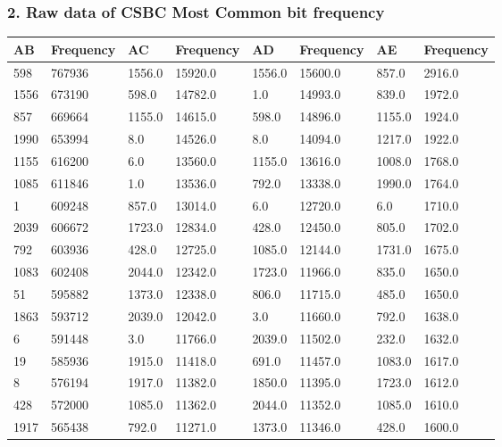 \subsubsection{2. Raw data of CSBC Most Common bit frequency}
\FloatBarrier
\begin{table}[H]
	\centering
	\small
	\renewcommand{\arraystretch}{0.7} %
	\begin{threeparttable}
		\begin{tabular}{p{1cm} p{2cm} p{1cm} p{2cm} p{1cm} p{2cm} p{1cm} p{2cm}}
			\hline
			AB \tnote{c} & Frequency & AC & Frequency & AD & Frequency & AE & Frequency \\ 
			\hline
			598  & 767936 & 1556.0 & 15920.0 & 1556.0 & 15600.0 & 857.0  & 2916.0  \\  
			1556 & 673190 & 598.0  & 14782.0 & 1.0    & 14993.0 & 839.0  & 1972.0  \\  
			857  & 669664 & 1155.0 & 14615.0 & 598.0  & 14896.0 & 1155.0 & 1924.0  \\  
			1990 & 653994 & 8.0    & 14526.0 & 8.0    & 14094.0 & 1217.0 & 1922.0  \\  
			1155 & 616200 & 6.0    & 13560.0 & 1155.0 & 13616.0 & 1008.0 & 1768.0  \\  
			1085 & 611846 & 1.0    & 13536.0 & 792.0  & 13338.0 & 1990.0 & 1764.0  \\  
			1    & 609248 & 857.0  & 13014.0 & 6.0    & 12720.0 & 6.0    & 1710.0  \\  
			2039 & 606672 & 1723.0 & 12834.0 & 428.0  & 12450.0 & 805.0  & 1702.0  \\  
			792  & 603936 & 428.0  & 12725.0 & 1085.0 & 12144.0 & 1731.0 & 1675.0  \\  
			1083 & 602408 & 2044.0 & 12342.0 & 1723.0 & 11966.0 & 835.0  & 1650.0  \\  
			51   & 595882 & 1373.0 & 12338.0 & 806.0  & 11715.0 & 485.0  & 1650.0  \\  
			1863 & 593712 & 2039.0 & 12042.0 & 3.0    & 11660.0 & 792.0  & 1638.0  \\  
			6    & 591448 & 3.0    & 11766.0 & 2039.0 & 11502.0 & 232.0  & 1632.0  \\  
			19   & 585936 & 1915.0 & 11418.0 & 691.0  & 11457.0 & 1083.0 & 1617.0  \\  
			8    & 576194 & 1917.0 & 11382.0 & 1850.0 & 11395.0 & 1723.0 & 1612.0  \\  
			428  & 572000 & 1085.0 & 11362.0 & 2044.0 & 11352.0 & 1085.0 & 1610.0  \\  
			1917 & 565438 & 792.0  & 11271.0 & 1373.0 & 11346.0 & 428.0  & 1600.0  \\  

\end{tabular}
\end{threeparttable}
\end{table}
